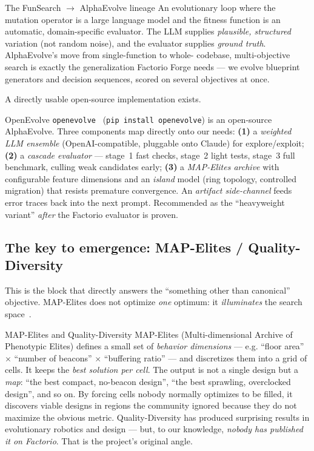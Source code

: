 \documentclass[11pt,a4paper]{article}
\begin{document}
\begin{notionbox}{The FunSearch $\rightarrow$ AlphaEvolve lineage}
An evolutionary loop where the mutation operator is a large language model and
the fitness function is an automatic, domain-specific evaluator. The LLM supplies
\emph{plausible, structured} variation (not random noise), and the evaluator
supplies \emph{ground truth}. AlphaEvolve's move from single-function to whole-
codebase, multi-objective search is exactly the generalization Factorio Forge
needs --- we evolve blueprint generators and decision sequences, scored on
several objectives at once.
\end{notionbox}

A directly usable open-source implementation exists.

\begin{toolbox}{OpenEvolve}
\texttt{openevolve}~\cite{openevolve} (\texttt{pip install openevolve}) is an
open-source AlphaEvolve. Three components map directly onto our needs:
\textbf{(1)} a \emph{weighted LLM ensemble} (OpenAI-compatible, pluggable onto
Claude) for explore/exploit; \textbf{(2)} a \emph{cascade evaluator} --- stage~1
fast checks, stage~2 light tests, stage~3 full benchmark, culling weak candidates
early; \textbf{(3)} a \emph{MAP-Elites archive} with configurable feature
dimensions and an \emph{island} model (ring topology, controlled migration) that
resists premature convergence. An \emph{artifact side-channel} feeds error
traces back into the next prompt. Recommended as the ``heavyweight variant''
\emph{after} the Factorio evaluator is proven.
\end{toolbox}

\subsection{The key to emergence: MAP-Elites / Quality-Diversity}

This is the block that directly answers the ``something other than canonical''
objective. MAP-Elites does not optimize \emph{one} optimum: it
\emph{illuminates} the search space~\cite{mapelites_emergentmind,qd_reference}.

\begin{notionbox}{MAP-Elites and Quality-Diversity}
MAP-Elites (Multi-dimensional Archive of Phenotypic Elites) defines a small set
of \emph{behavior dimensions} --- e.g. ``floor area'' $\times$ ``number of
beacons'' $\times$ ``buffering ratio'' --- and discretizes them into a grid of
cells. It keeps the \emph{best solution per cell}. The output is not a single
design but a \emph{map}: ``the best compact, no-beacon design'', ``the best
sprawling, overclocked design'', and so on. By forcing cells nobody normally
optimizes to be filled, it discovers viable designs in regions the community
ignored because they do not maximize the obvious metric. Quality-Diversity has
produced surprising results in evolutionary robotics and design --- but, to our
knowledge, \emph{nobody has published it on Factorio}. That is the project's
original angle.
\end{notionbox}
\end{document}
